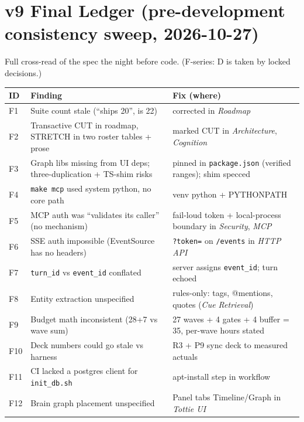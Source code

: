 \section{v9 Final Ledger (pre-development consistency sweep, 2026-10-27)}
Full cross-read of the spec the night before code. (F-series: D is taken by locked decisions.)
\begin{longtable}{@{}p{}p{}p{}@{}}
\toprule
ID & Finding & Fix (where) \\
\midrule
F1 & Suite count stale (``ships 20'', is 22) & corrected in \emph{Roadmap} \\
F2 & Transactive CUT in roadmap, STRETCH in two roster tables + prose & marked CUT in \emph{Architecture}, \emph{Cognition} \\
F3 & Graph libs missing from UI deps; three-duplication + TS-shim risks & pinned in \texttt{package.json} (verified ranges); shim specced \\
F4 & \texttt{make mcp} used system python, no core path & venv python + PYTHONPATH \\
F5 & MCP auth was ``validates its caller'' (no mechanism) & fail-loud token + local-process boundary in \emph{Security}, \emph{MCP} \\
F6 & SSE auth impossible (EventSource has no headers) & \texttt{?token=} on \texttt{/events} in \emph{HTTP API} \\
F7 & \texttt{turn\_id} vs \texttt{event\_id} conflated & server assigns \texttt{event\_id}; turn echoed \\
F8 & Entity extraction unspecified & rules-only: tags, @mentions, quotes (\emph{Cue Retrieval}) \\
F9 & Budget math inconsistent (28+7 vs wave sum) & 27 waves + 4 gates + 4 buffer = 35, per-wave hours stated \\
F10 & Deck numbers could go stale vs harness & R3 + P9 sync deck to measured actuals \\
F11 & CI lacked a postgres client for \texttt{init\_db.sh} & apt-install step in workflow \\
F12 & Brain graph placement unspecified & Panel tabs Timeline/Graph in \emph{Tottie UI} \\
\bottomrule
\end{longtable}

